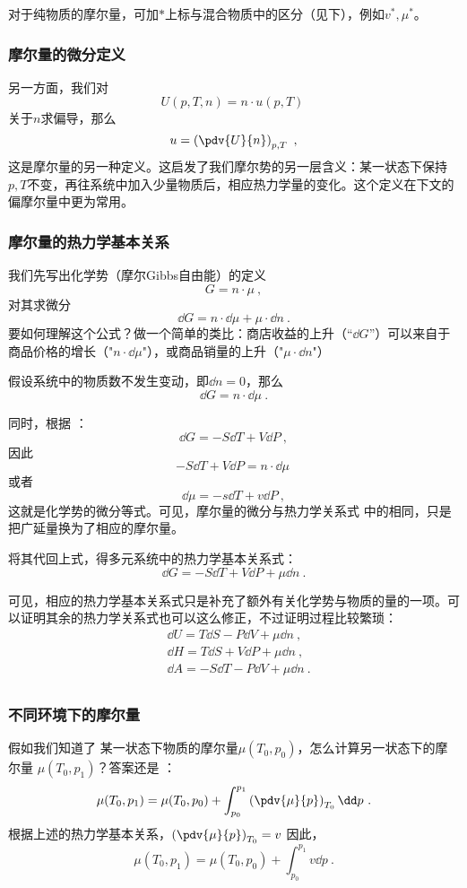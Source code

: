 对于纯物质的摩尔量，可加$*$上标与混合物质中的区分（见下），例如$v^*, \mu^*$。

\subsubsection{摩尔量的微分定义}
另一方面，我们对
$$U(p, T, n) = n \cdot u (p, T)~$$
关于$n$求偏导，那么
$$u = \left( \pdv{U}{n} \right)_{p,T}~,$$
这是摩尔量的另一种定义。这启发了我们摩尔势的另一层含义：某一状态下保持$p,T$不变，再往系统中加入少量物质后，相应热力学量的变化。这个定义在下文的偏摩尔量中更为常用。

\subsubsection{摩尔量的热力学基本关系}

我们先写出化学势（摩尔Gibbs自由能）的定义
$$G = n \cdot \mu~,$$
对其求微分
$$\dd G = n \cdot \dd \mu +  \mu \cdot\dd n~.$$
要如何理解这个公式？做一个简单的类比：商店收益的上升（“$\dd G$”）可以来自于商品价格的增长（"$n \cdot \dd \mu$"），或商品销量的上升（"$\mu \cdot \dd n$"）

假设系统中的物质数不发生变动，即$\dd n = 0$，那么
$$\dd G = n \cdot \dd \mu~.$$

同时，根据 ：
$$\dd G = -S \dd T + V \dd P~,$$
因此
$$-S \dd T + V \dd P = n \cdot \dd \mu~$$
或者
$$
\dd \mu = -s \dd T + v \dd P~,
$$
这就是化学势的微分等式。可见，摩尔量的微分与热力学关系式 中的相同，只是把广延量换为了相应的摩尔量。

将其代回上式，得多元系统中的热力学基本关系式：
$$\dd G = -S \dd T + V \dd P + \mu \dd n~.$$

可见，相应的热力学基本关系式只是补充了额外有关化学势与物质的量的一项。可以证明其余的热力学关系式也可以这么修正，不过证明过程比较繁琐：
$$
\begin{aligned}
&\dd U = T \dd S - P \dd V + \mu \dd n~,\\
&\dd H = T \dd S + V \dd P + \mu \dd n~,\\
&\dd A = -S \dd T - P \dd V + \mu \dd n~.\\
\end{aligned}
$$

\subsubsection{不同环境下的摩尔量}
假如我们知道了 某一状态下物质的摩尔量$\mu(T_0,p_0)$，怎么计算另一状态下的摩尔量 $\mu(T_0,p_1)$？答案还是 ：
$$\mu(T_0,p_1) = \mu(T_0,p_0) + \int_{p_0}^{p_1} \left( \pdv{\mu}{p} \right)_{T_0} \dd p~.$$
根据上述的热力学基本关系，$\left( \pdv{\mu}{p} \right)_{T_0} = v$
因此，$$\mu(T_0,p_1) = \mu(T_0,p_0) + \int_{p_0}^{p_1} v \dd p~.$$


